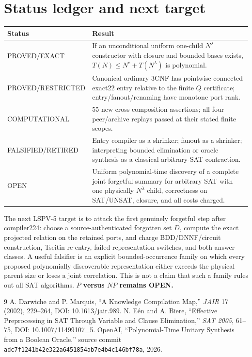 \documentclass[11pt]{article}
\begin{document}
\section{Status ledger and next target}
\begin{center}\begin{tabular}{p{.20\linewidth}p{.72\linewidth}}\toprule
Status & Result\\\midrule
PROVED/EXACT & If an unconditional uniform one-child $N^\lambda$ constructor with closure and bounded bases exists, $T(N)\le N^c+T(N^\lambda)$ is polynomial.\\
PROVED/RESTRICTED & Canonical ordinary 3CNF has pointwise connected exact22 entry relative to the finite $Q$ certificate; entry/fanout/renaming have monotone port rank.\\
COMPUTATIONAL & 55 new cross-composition assertions; all four peer/archive replays passed at their stated finite scopes.\\
FALSIFIED/RETIRED & Entry compiler as a shrinker; fanout as a shrinker; interpreting bounded elimination or oracle synthesis as a classical arbitrary-SAT contraction.\\
OPEN & Uniform polynomial-time discovery of a complete joint forgetful summary for arbitrary SAT with one physically $N^\lambda$ child, correctness on SAT/UNSAT, closure, and all costs charged.\\\bottomrule
\end{tabular}\end{center}

The next LSPV-5 target is to attack the first genuinely forgetful step after compiler224: choose a source-authenticated forgotten set $D$, compute the exact projected relation on the retained ports, and charge BDD/DNNF/circuit construction, Tseitin re-entry, failed representation switches, and both answer classes.  A useful falsifier is an explicit bounded-occurrence family on which every proposed polynomially discoverable representation either exceeds the physical parent size or loses a joint correlation.  This is not a claim that such a family rules out all SAT algorithms.  \textbf{$P$ versus $NP$ remains OPEN.}

\begin{thebibliography}{9}
 A. Darwiche and P. Marquis, ``A Knowledge Compilation Map,'' \emph{JAIR} 17 (2002), 229--264, DOI: 10.1613/jair.989.
 N. E\'en and A. Biere, ``Effective Preprocessing in SAT Through Variable and Clause Elimination,'' \emph{SAT 2005}, 61--75, DOI: 10.1007/11499107\_5.
 OpenAI, ``Polynomial-Time Unitary Synthesis from a Boolean Oracle,'' source commit \texttt{adc7f1241b42e322a6451854ab7e4b4c146bf78a}, 2026.
\end{thebibliography}
\end{document}
